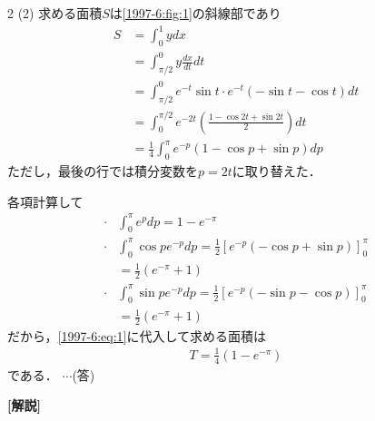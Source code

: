 \documentclass[../../../../main.tex]{subfiles}
\begin{document}
\begin{multicols}{2}
  \vspace{10pt}
  (2)
  求める面積$S$は\cref{1997-6:fig:1}の斜線部であり
  \begin{align}
    S & = \int_0^{1} y dx                                                           \\
      & = \int_{\pi/2}^{0} y \frac{dx}{dt} dt                                       \\
      & = \int_{\pi/2}^{0} e^{-t}\sin t \cdot e^{-t}(-\sin t-\cos t) dt             \\
      & = \int_0^{\pi/2} e^{-2t} \left(\frac{1-\cos 2t+\sin 2t}{2}\right) dt        \\
      & = \frac{1}{4}\int_0^{\pi} e^{-p} (1-\cos p + \sin p) dp \label{1997-6:eq:1}
  \end{align}
  ただし，最後の行では積分変数を$p=2t$に取り替えた．

  各項計算して
  \begin{align*}
    \cdot & \int_0^{\pi} e^{p} dp
    = 1 - e^{-\pi}                                                \\
    \cdot & \int_0^{\pi} \cos p e^{-p} dp
    = \frac{1}{2} \left[e^{-p}(-\cos p + \sin p)\right]_{0}^{\pi} \\
          & = \frac{1}{2}(e^{-\pi}+1)                             \\
    \cdot & \int_0^{\pi} \sin p e^{-p} dp
    = \frac{1}{2} \left[e^{-p}(-\sin p - \cos p)\right]_{0}^{\pi} \\
          & = \frac{1}{2}(e^{-\pi}+1)
  \end{align*}
  だから，\cref{1997-6:eq:1}に代入して求める面積は
  \begin{align*}
    T = \frac{1}{4}\left(1-e^{-\pi}\right)
  \end{align*}
  である．  $\cdots$(答)

  \vspace{10pt}
  {\bf[解説]}
  \newpage
\end{multicols}
\end{document}
